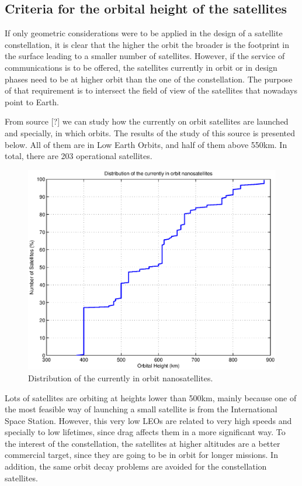 \subsection{Criteria for the orbital height of the satellites}
If only geometric considerations were to be applied in the design of a satellite constellation, it is clear that the higher the orbit the broader is the footprint in the surface leading to a smaller number of satellites. However, if the service of communications is to be offered, the satellites currently in orbit or in design phases need to be at higher orbit than the one of the constellation. The purpose of that requirement is to intersect the field of view of the satellites that nowadays point to Earth.

From source [?] we can study how the currently on orbit satellites are launched and specially, in which orbits. The results of the study of this source is presented below. All of them are in Low Earth Orbits, and half of them above 550km. In total, there are 203 operational satellites.

\begin{figure}[H]
	\includegraphics[scale=0.8]{CurrentOrbitDistribution}
	\caption{Distribution of the currently in orbit nanosatellites.}	
\end{figure}

Lots of satellites are orbiting at heights lower than 500km, mainly because one of the most feasible way of launching a small satellite is from the International Space Station. However, this very low LEOs are related to very high speeds and specially to low lifetimes, since drag affects them in a more significant way. To the interest of the constellation, the satellites at higher altitudes are a better commercial target, since they are going to be in orbit for longer missions. In addition, the same orbit decay problems are avoided for the constellation satellites.

